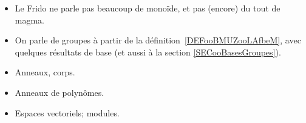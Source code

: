   \label{THEMEooStructuresAlgebriques}
\begin{itemize}
  \item Le Frido ne parle pas beaucoup de monoïde, et pas (encore) du tout de magma.
  \item On parle de groupes à partir de la définition~\ref{DEFooBMUZooLAfbeM}, avec quelques résultats de base (et aussi à la section \ref{SECooBasesGroupes}).
  \item Anneaux, corps.
  \item Anneaux de polynômes.
  \item Espaces vectoriels; modules.  
\end{itemize}
